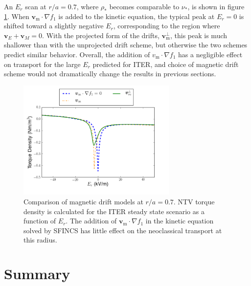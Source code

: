 \documentclass[aip, pop, preprint]{revtex4-1}
\numberwithin{figure}{section}
\numberwithin{equation}{section}
\begin{document}
An $E_r$ scan at $r/a = 0.7$, where $\rho_*$ becomes comparable to $\nu_*$, is shown in figure \ref{fig:driftschemes}. When $\bm{v}_{\text{m}} \cdot \nabla f_1$ is added to the kinetic equation, the typical peak at $E_r = 0$ is shifted toward a slightly negative $E_r$, corresponding to the region where $\bm{v}_E + \bm{v}_M = 0$. With the projected form of the drifts, $\bm{v}_{\text{m}}^{\perp}$, this peak is much shallower than with the unprojected drift scheme, but otherwise the two schemes predict similar behavior. Overall, the addition of $v_{\text{m}} \cdot \nabla f_1$ has a negligible effect on transport for the large $E_r$ predicted for ITER, and choice of magnetic drift scheme would not dramatically change the results in previous sections.  

\begin{figure}[h!]
\centering
\includegraphics[width=0.7\textwidth]{mdscomparison.png}
\caption{\label{fig:driftschemes} Comparison of magnetic drift models at $r/a = 0.7$. NTV torque density is calculated for the ITER steady state scenario as a function of $E_r$. The addition of $\bm{v}_{\text{m}} \cdot \nabla f_1$ in the kinetic equation solved by SFINCS has little effect on the neoclassical transport at this radius. }
\end{figure}

\FloatBarrier

\section{Summary}\label{summary}
\end{document}

